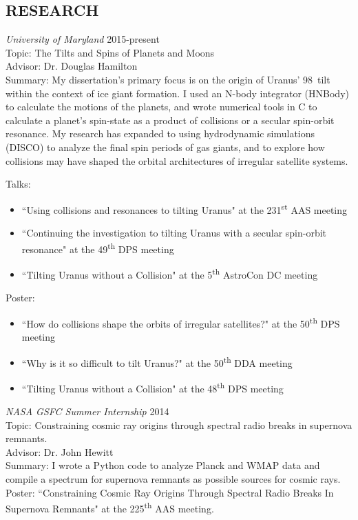 \documentclass[line,margin]{res}
\begin{document}
\begin{resume}
\section{RESEARCH}
{\sl University of Maryland} \hfill 2015-present\\
Topic: The Tilts and Spins of Planets and Moons\\
Advisor: Dr. Douglas Hamilton\\
Summary: My dissertation's primary focus is on the origin of Uranus' 98\textdegree~tilt within the context of ice giant formation. I used an N-body integrator (HNBody) to calculate the motions of the planets, and wrote numerical tools in C to calculate a planet's spin-state as a product of collisions or a secular spin-orbit resonance. My research has expanded to using hydrodynamic simulations (DISCO) to analyze the final spin periods of gas giants, and to explore how collisions may have shaped the orbital architectures of irregular satellite systems.

Talks:
\begin{itemize}
\item ``Using collisions and resonances to tilting Uranus" at the 231\textsuperscript{st} AAS meeting
\item ``Continuing the investigation to tilting Uranus with a secular spin-orbit resonance" at the 49\textsuperscript{th} DPS meeting
\item ``Tilting Uranus without a Collision" at the 5\textsuperscript{th} AstroCon DC meeting
\end{itemize}
Poster:
\begin{itemize}
\item ``How do collisions shape the orbits of irregular satellites?" at the 50\textsuperscript{th} DPS meeting
\item ``Why is it so difficult to tilt Uranus?" at the 50\textsuperscript{th} DDA meeting
\item ``Tilting Uranus without a Collision" at the 48\textsuperscript{th} DPS meeting

\end{itemize}

{\sl NASA GSFC Summer Internship} \hfill 2014\\
				Topic: Constraining cosmic ray origins through spectral radio breaks in supernova remnants.\\
				Advisor: Dr. John Hewitt\\
Summary: I wrote a Python code to analyze Planck and WMAP data and compile a spectrum for supernova remnants as possible sources for cosmic rays.\\
Poster: ``Constraining Cosmic Ray Origins Through Spectral Radio Breaks In Supernova Remnants" at the 225\textsuperscript{th} AAS meeting.


\end{resume}
\end{document}
